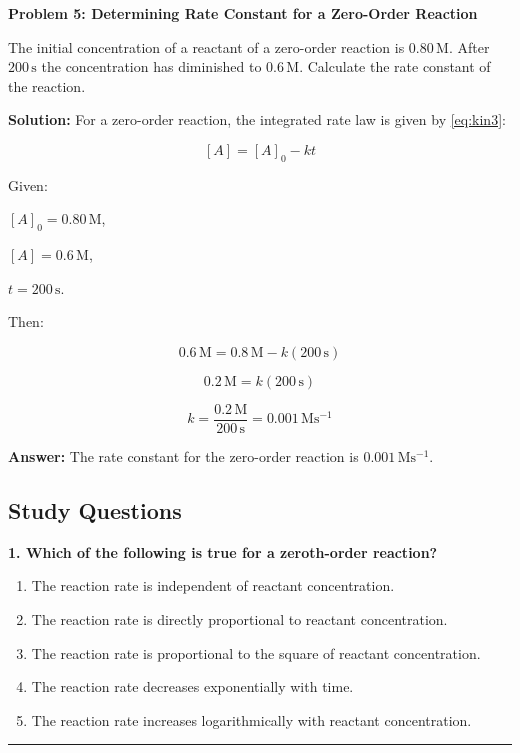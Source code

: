 \documentclass[
  9pt,
]{extbook}
\providecommand{\tightlist}{%
  \setlength{\itemsep}{0pt}\setlength{\parskip}{0pt}}
\theoremstyle{definition}
\theoremstyle{definition}
\theoremstyle{definition}
\theoremstyle{remark}
\begin{document}
\textbf{Problem 5: Determining Rate Constant for a Zero-Order Reaction}

The initial concentration of a reactant of a zero-order reaction is \(0.80\,\text{M}\). After \(200\,\text{s}\) the concentration has diminished to \(0.6\,\text{M}\). Calculate the rate constant of the reaction.

\textbf{Solution:} For a zero-order reaction, the integrated rate law is given by \eqref{eq:kin3}:

\[[A] = [A]_0 - kt\]

Given:

\([A]_0 = 0.80\,\text{M}\),

\([A] = 0.6\,\text{M}\),

\(t=200\,\text{s}\).

Then:

\[0.6\,\text{M} = 0.8\,\text{M} - k(200\,\text{s})\]

\[0.2\,\text{M} = k(200\,\text{s})\]

\[k = \frac{0.2\,\text{M}}{200\,\text{s}} = 0.001\,\text{M}\text{s}^{-1}\]

\textbf{Answer:} The rate constant for the zero-order reaction is \(0.001\,\text{M}\text{s}^{-1}\).

\hypertarget{quest15}{%
\subsection{Study Questions}\label{quest15}}

\textbf{1. Which of the following is true for a zeroth-order reaction?}

\begin{enumerate}
\def\labelenumi{\alph{enumi}.}
\tightlist
\item
  The reaction rate is independent of reactant concentration.
\item
  The reaction rate is directly proportional to reactant concentration.
\item
  The reaction rate is proportional to the square of reactant concentration.
\item
  The reaction rate decreases exponentially with time.
\item
  The reaction rate increases logarithmically with reactant concentration.
\end{enumerate}

\begin{center}\rule{0.5\linewidth}{0.5pt}\end{center}
\end{document}
